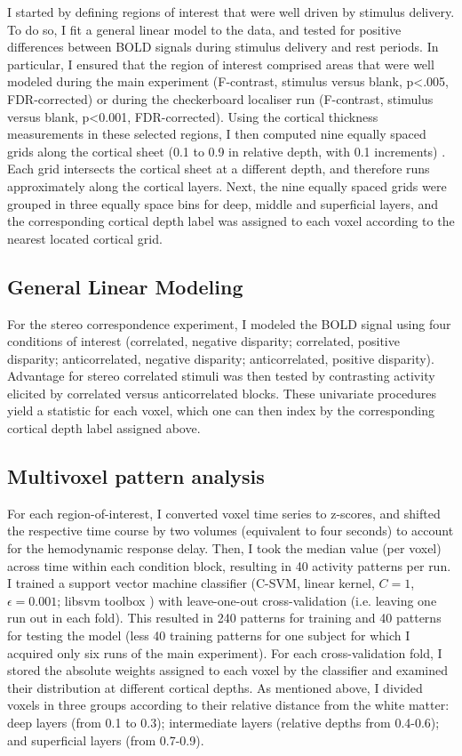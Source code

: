 I started by defining regions of interest that were well driven by stimulus delivery. To do so, I fit a general linear model to the data, and tested for positive differences between BOLD signals during stimulus delivery and rest periods. In particular, I ensured that the region of interest comprised areas that were well modeled during the main experiment (F-contrast, stimulus versus blank, p<.005, FDR-corrected) or during the checkerboard localiser run (F-contrast, stimulus versus blank, p<0.001, FDR-corrected).
Using the cortical thickness measurements in these selected regions, I then computed nine equally spaced grids along the cortical sheet (0.1 to 0.9 in relative depth, with 0.1 increments) \cite{Zimmermann:2011kl}. Each grid intersects the cortical sheet at a different depth, and therefore runs approximately along the cortical layers. Next, the nine equally spaced grids were grouped in three equally space bins for deep, middle and superficial layers, and the corresponding cortical depth label was assigned to each voxel according to the nearest located cortical grid.

\subsection{General Linear Modeling}
For the stereo correspondence experiment, I modeled the BOLD signal using four conditions of interest (correlated, negative disparity; correlated, positive disparity; anticorrelated, negative disparity; anticorrelated, positive disparity). Advantage for stereo correlated stimuli was then tested by contrasting activity elicited by correlated versus anticorrelated blocks. These univariate procedures yield a statistic for each voxel, which one can then index by the corresponding cortical depth label assigned above.

\subsection{Multivoxel pattern analysis}
For each region-of-interest, I converted voxel time series to z-scores, and shifted the respective time course by two volumes (equivalent to four seconds) to account for the hemodynamic response delay. Then, I took the median value (per voxel) across time within each condition block, resulting in 40 activity patterns per run. I trained a support vector machine classifier (C-SVM, linear kernel, $C=1$, $\epsilon=0.001$; libsvm toolbox \cite{Chang:2011:LLS:1961189.1961199}) with leave-one-out cross-validation (i.e. leaving one run out in each fold). This resulted in 240 patterns for training and 40 patterns for testing the model (less 40 training patterns for one subject for which I acquired only six runs of the main experiment). For each cross-validation fold, I stored the absolute weights assigned to each voxel by the classifier and examined their distribution at different cortical depths. As mentioned above, I divided voxels in three groups according to their relative distance from the white matter: deep layers (from 0.1 to 0.3); intermediate layers (relative depths from 0.4-0.6); and superficial layers (from 0.7-0.9).

